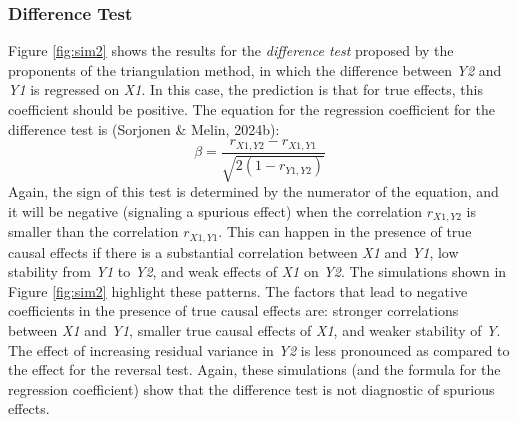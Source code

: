 \documentclass[
  man,floatsintext]{apa6}
\begin{document}
\subsubsection{Difference Test}\label{difference-test}

Figure \ref{fig:sim2} shows the results for the \emph{difference test} proposed by the proponents of the triangulation method, in which the difference between \emph{Y2} and \emph{Y1} is regressed on \emph{X1}. In this case, the prediction is that for true effects, this coefficient should be positive. The equation for the regression coefficient for the difference test is (Sorjonen \& Melin, 2024b): \[\beta = \frac{r_{X1,Y2} - r_{X1,Y1}} {\sqrt{2(1 - r_{Y1,Y2})}}\] Again, the sign of this test is determined by the numerator of the equation, and it will be negative (signaling a spurious effect) when the correlation \(r_{X1,Y2}\) is smaller than the correlation \(r_{X1,Y1}\). This can happen in the presence of true causal effects if there is a substantial correlation between \emph{X1} and \emph{Y1}, low stability from \emph{Y1} to \emph{Y2}, and weak effects of \emph{X1} on \emph{Y2}. The simulations shown in Figure \ref{fig:sim2} highlight these patterns. The factors that lead to negative coefficients in the presence of true causal effects are: stronger correlations between \emph{X1} and \emph{Y1}, smaller true causal effects of \emph{X1}, and weaker stability of \emph{Y}. The effect of increasing residual variance in \emph{Y2} is less pronounced as compared to the effect for the reversal test. Again, these simulations (and the formula for the regression coefficient) show that the difference test is not diagnostic of spurious effects.
\end{document}
